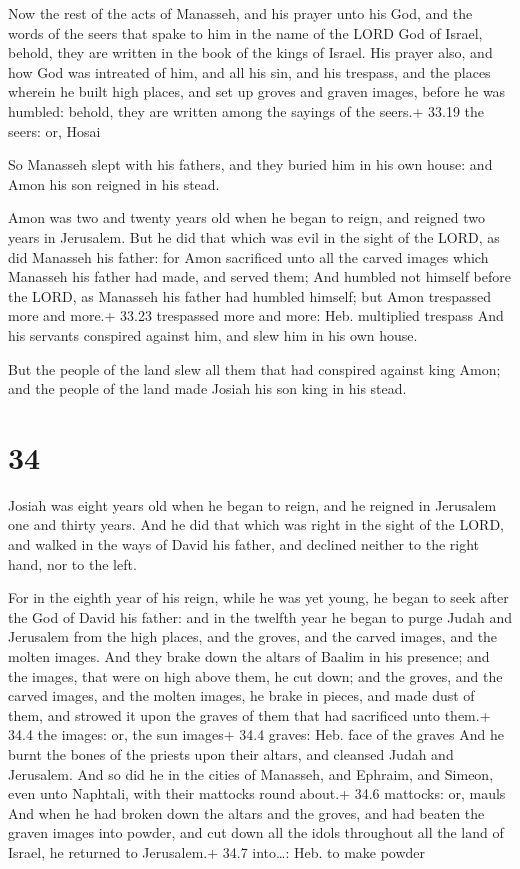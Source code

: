  Now the rest of the acts of Manasseh, and his prayer
unto his God, and the words of the seers that spake to him in the name
of the LORD God of Israel, behold, they are written in the book of the
kings of Israel.  His prayer also, and how God was
intreated of him, and all his sin, and his trespass, and the places
wherein he built high places, and set up groves and graven images,
before he was humbled: behold, they are written among the sayings of the
seers.+ 33.19 the seers: or, Hosai

 So Manasseh slept with his fathers, and they buried him
in his own house: and Amon his son reigned in his stead.

 Amon was two and twenty years old when he began to
reign, and reigned two years in Jerusalem.  But he did that
which was evil in the sight of the LORD, as did Manasseh his father: for
Amon sacrificed unto all the carved images which Manasseh his father had
made, and served them;  And humbled not himself before the
LORD, as Manasseh his father had humbled himself; but Amon trespassed
more and more.+ 33.23 trespassed more and more: Heb. multiplied trespass
 And his servants conspired against him, and slew him in
his own house.

 But the people of the land slew all them that had
conspired against king Amon; and the people of the land made Josiah his
son king in his stead.

\hypertarget{section-33}{%
\section{34}\label{section-33}}

 Josiah was eight years old when he began to reign, and he
reigned in Jerusalem one and thirty years.  And he did that
which was right in the sight of the LORD, and walked in the ways of
David his father, and declined neither to the right hand, nor to the
left.

 For in the eighth year of his reign, while he was yet
young, he began to seek after the God of David his father: and in the
twelfth year he began to purge Judah and Jerusalem from the high places,
and the groves, and the carved images, and the molten images.
 And they brake down the altars of Baalim in his presence;
and the images, that were on high above them, he cut down; and the
groves, and the carved images, and the molten images, he brake in
pieces, and made dust of them, and strowed it upon the graves of them
that had sacrificed unto them.+ 34.4 the images: or, the sun images+
34.4 graves: Heb. face of the graves  And he burnt the bones
of the priests upon their altars, and cleansed Judah and Jerusalem.
 And so did he in the cities of Manasseh, and Ephraim, and
Simeon, even unto Naphtali, with their mattocks round about.+ 34.6
mattocks: or, mauls  And when he had broken down the altars
and the groves, and had beaten the graven images into powder, and cut
down all the idols throughout all the land of Israel, he returned to
Jerusalem.+ 34.7 into\ldots: Heb. to make powder

